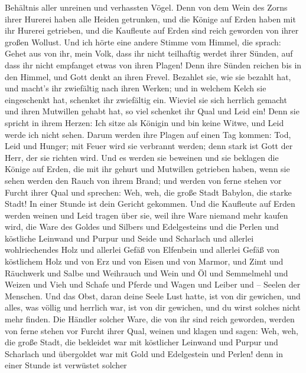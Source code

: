 Behältnis aller unreinen und verhassten Vögel.  Denn von dem
Wein des Zorns ihrer Hurerei haben alle Heiden getrunken, und die Könige
auf Erden haben mit ihr Hurerei getrieben, und die Kaufleute auf Erden
sind reich geworden von ihrer großen Wollust.  Und ich hörte
eine andere Stimme vom Himmel, die sprach: Gehet aus von ihr, mein Volk,
dass ihr nicht teilhaftig werdet ihrer Sünden, auf dass ihr nicht
empfanget etwas von ihren Plagen!  Denn ihre Sünden reichen
bis in den Himmel, und Gott denkt an ihren Frevel.  Bezahlet
sie, wie sie bezahlt hat, und macht's ihr zwiefältig nach ihren Werken;
und in welchem Kelch sie eingeschenkt hat, schenket ihr zwiefältig ein.
 Wieviel sie sich herrlich gemacht und ihren Mutwillen
gehabt hat, so viel schenket ihr Qual und Leid ein! Denn sie spricht in
ihrem Herzen: Ich sitze als Königin und bin keine Witwe, und Leid werde
ich nicht sehen.  Darum werden ihre Plagen auf einen Tag
kommen: Tod, Leid und Hunger; mit Feuer wird sie verbrannt werden; denn
stark ist Gott der Herr, der sie richten wird.  Und es
werden sie beweinen und sie beklagen die Könige auf Erden, die mit ihr
gehurt und Mutwillen getrieben haben, wenn sie sehen werden den Rauch
von ihrem Brand;  und werden von ferne stehen vor Furcht
ihrer Qual und sprechen: Weh, weh, die große Stadt Babylon, die starke
Stadt! In einer Stunde ist dein Gericht gekommen.  Und die
Kaufleute auf Erden werden weinen und Leid tragen über sie, weil ihre
Ware niemand mehr kaufen wird,  die Ware des Goldes und
Silbers und Edelgesteins und die Perlen und köstliche Leinwand und
Purpur und Seide und Scharlach und allerlei wohlriechendes Holz und
allerlei Gefäß von Elfenbein und allerlei Gefäß von köstlichem Holz und
von Erz und von Eisen und von Marmor,  und Zimt und
Räuchwerk und Salbe und Weihrauch und Wein und Öl und Semmelmehl und
Weizen und Vieh und Schafe und Pferde und Wagen und Leiber und -- Seelen
der Menschen.  Und das Obst, daran deine Seele Lust hatte,
ist von dir gewichen, und alles, was völlig und herrlich war, ist von
dir gewichen, und du wirst solches nicht mehr finden.  Die
Händler solcher Ware, die von ihr sind reich geworden, werden von ferne
stehen vor Furcht ihrer Qual, weinen und klagen  und sagen:
Weh, weh, die große Stadt, die bekleidet war mit köstlicher Leinwand und
Purpur und Scharlach und übergoldet war mit Gold und Edelgestein und
Perlen!  denn in einer Stunde ist verwüstet solcher
